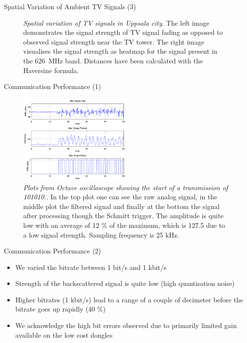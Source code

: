 \documentclass[apectratio=169]{beamer}
\begin{document}
\begin{frame}{Spatial Variation of Ambient TV Signals (3)}
\begin{figure}[h]
\begin{minipage}{0.49\columnwidth}
	\end{minipage}
	\caption{\emph{Spatial variation of TV signals in Uppsala city}. The left image demonstrates the signal strength of TV signal fading as opposed to observed signal strength near the TV tower. The right image visualises the signal strength as heatmap for the signal present in the \SI{626}{\mega\hertz} band. Distances have been calculated with the Haversine formula. }
	\label{fig:haversine}
\end{figure}
\end{frame}

\begin{frame}{Communication Performance (1)}
	\begin{figure}[h]
	\centering
	\includegraphics[width=0.5\textwidth]{./fig/transmission}
	\caption{\emph{Plots from Octave oscilloscope showing the start of a transmission of 101010..} In the top plot one can see the raw analog signal, in the middle plot the filtered signal and finally at the bottom the signal after processing though the Schmitt trigger. The amplitude is quite low with an average of 12 \% of the maximum, which is 127.5 due to a low signal strength. Sampling frequency is 25 kHz. }
	\label{fig:transmission}	
\end{figure}
\end{frame}

\begin{frame}{Communication Performance (2)}
	\begin{itemize}
		\item<1-> We varied the bitrate between 1 bit/s and 1 kbit/s 
		\item<2-> Strength of the backscattered signal is quite low (high quantisation noise)
		\item<3-> Higher bitrates (1 kbit/s) lead to a range of a couple of decimeter before the bitrate goes up rapidly (40 \%)
		\item<4-> We acknowledge the high bit errors observed due to primarily limited gain available on the low cost dongles
	\end{itemize}
\end{frame}
\end{document}
